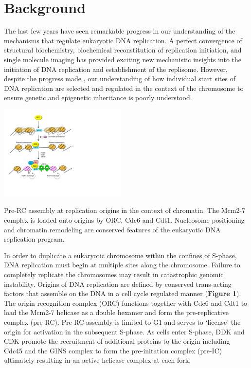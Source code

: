 \section{Background}
The last few years have seen remarkable progress in our understanding of the mechanisms that regulate eukaryotic DNA replication.  A perfect convergence of structural biochemistry\citep{Bleichert2015-zl}, biochemical reconstitution of replication initiation\citep{Yeeles2015-pe}, and single molecule imaging\citep{Ticau2015-gg} has provided exciting new mechanistic insights into the initiation of DNA replication and establishment of the replisome.  However, despite the progress made \invitro, our understanding of how individual start sites of DNA replication are selected and regulated in the context of the chromosome to ensure genetic and epigenetic inheritance is poorly understood\citep{Prioleau2016-bj}. 
\begin{floatingfigure}[r]{2.5in}
\vspace{-8mm}
\begin{center}
\includegraphics[width=2.5in]{r35_figures/orc_turnover_model.pdf}
\end{center}
\vspace{3mm}
\caption{Pre-RC assembly at replication origins in the context of chromatin. The Mcm2-7 complex is loaded onto origins by ORC, Cdc6 and Cdt1. Nucleosome positioning and chromatin remodeling are conserved features of the eukaryotic DNA replication program\citep{Ding2011-ni}.}%
\end{floatingfigure}

In order to duplicate a eukaryotic chromosome within the confines of S-phase, DNA replication must begin at multiple sites along the chromosome.  Failure to completely replicate the chromosomes may result in catastrophic genomic instability\citep{Green2010-ht}.  Origins of DNA replication are defined by conserved trans-acting factors that assemble on the DNA in  a cell cycle regulated manner ({\color{dukeblue}\textbf{Figure 1}}). The origin recognition complex (ORC) functions together with Cdc6 and Cdt1 to load the Mcm2-7 helicase as a double hexamer and form the pre-replicative complex (pre-RC)\citep{Bell2013-pk}. Pre-RC assembly is limited to G1 and serves to `license' the origin for activation in the subsequent S-phase\citep{Siddiqui2013-jz}. As cells enter S-phase, DDK and CDK promote the recruitment of additional proteins to the origin including Cdc45 and the GINS complex to form the pre-initation complex (pre-IC)\citep{Tanaka2013-fl} ultimately resulting in an active helicase complex at each fork.   

